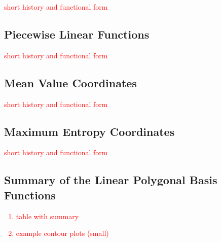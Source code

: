 \documentclass[preprint,10pt]{elsarticle}
\newcommand{\tcr}[1]{\textcolor{red}{#1}}
\begin{document}
\tcr{short history and functional form}

\subsection{Piecewise Linear Functions}

\tcr{short history and functional form}

\subsection{Mean Value Coordinates}

\tcr{short history and functional form}

\subsection{Maximum Entropy Coordinates}

\tcr{short history and functional form}

\subsection{Summary of the Linear Polygonal Basis Functions}

\tcr
{
\begin{enumerate}
\item table with summary
\item example contour plots (small)
\end{enumerate}
}

\end{document}
